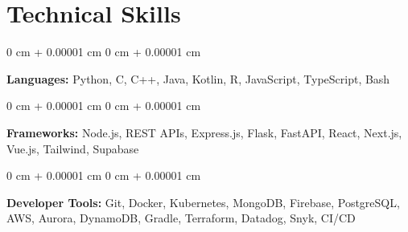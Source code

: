 \documentclass[10pt, letterpaper]{article}
\newenvironment{onecolentry}{
    \begin{adjustwidth}{
        0 cm + 0.00001 cm
    }{
        0 cm + 0.00001 cm
    }
}{
    \end{adjustwidth}
}
\begin{document}
    \vspace{0.10 cm}
    \section{Technical Skills}

    \begin{onecolentry}
        \textbf{Languages:} Python, C, C++, Java, Kotlin, R, JavaScript, TypeScript, Bash
    \end{onecolentry}

    \vspace{0.1 cm}

    \begin{onecolentry}
        \textbf{Frameworks:} Node.js, REST APIs, Express.js, Flask, FastAPI, React, Next.js, Vue.js, Tailwind, Supabase
    \end{onecolentry}

    \vspace{0.1 cm}

    \begin{onecolentry}
        \textbf{Developer Tools:} Git, Docker, Kubernetes, MongoDB, Firebase, PostgreSQL, AWS, Aurora, DynamoDB, Gradle, Terraform, Datadog, Snyk, CI/CD
    \end{onecolentry}
\end{document}
